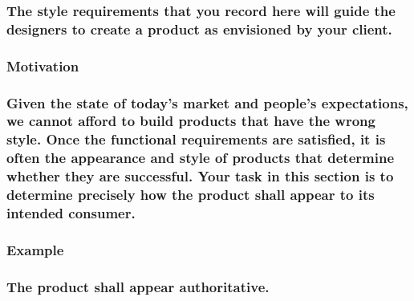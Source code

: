 \documentclass[
]{article}
\begin{document}
\hypertarget{the-style-requirements-that-you-record-here-will-guide-the-designers-to-create-a-product-as-envisioned-by-your-client.}{%
\subsubsection{The style requirements that you record here will guide
the designers to create a product as envisioned by your
client.}\label{the-style-requirements-that-you-record-here-will-guide-the-designers-to-create-a-product-as-envisioned-by-your-client.}}

\hypertarget{motivation-30}{%
\subsubsection{Motivation}\label{motivation-30}}

\hypertarget{given-the-state-of-todays-market-and-peoples-expectations-we-cannot-afford-to-build-products-that-have-the-wrong-style.-once-the-functional-requirements-are-satisfied-it-is-often-the-appearance-and-style-of-products-that-determine-whether-they-are-successful.-your-task-in-this-section-is-to-determine-precisely-how-the-product-shall-appear-to-its-intended-consumer.}{%
\subsubsection{Given the state of today's market and people's
expectations, we cannot afford to build products that have the wrong
style. Once the functional requirements are satisfied, it is often the
appearance and style of products that determine whether they are
successful. Your task in this section is to determine precisely how the
product shall appear to its intended
consumer.}\label{given-the-state-of-todays-market-and-peoples-expectations-we-cannot-afford-to-build-products-that-have-the-wrong-style.-once-the-functional-requirements-are-satisfied-it-is-often-the-appearance-and-style-of-products-that-determine-whether-they-are-successful.-your-task-in-this-section-is-to-determine-precisely-how-the-product-shall-appear-to-its-intended-consumer.}}

\hypertarget{example-4}{%
\subsubsection{Example}\label{example-4}}

\hypertarget{the-product-shall-appear-authoritative.}{%
\subsubsection{The product shall appear
authoritative.}\label{the-product-shall-appear-authoritative.}}
\end{document}
